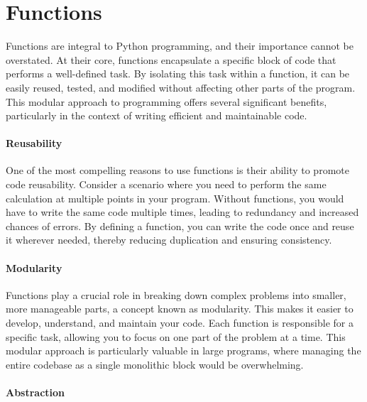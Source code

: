 \documentclass[
  letterpaper,
  DIV=11,
  numbers=noendperiod]{scrreprt}
\begin{document}
\hypertarget{sec-functions}{%
\chapter{Functions}\label{sec-functions}}

Functions are integral to Python programming, and their importance
cannot be overstated. At their core, functions encapsulate a specific
block of code that performs a well-defined task. By isolating this task
within a function, it can be easily reused, tested, and modified without
affecting other parts of the program. This modular approach to
programming offers several significant benefits, particularly in the
context of writing efficient and maintainable code.

\hypertarget{reusability}{%
\subsubsection{Reusability}\label{reusability}}

One of the most compelling reasons to use functions is their ability to
promote code reusability. Consider a scenario where you need to perform
the same calculation at multiple points in your program. Without
functions, you would have to write the same code multiple times, leading
to redundancy and increased chances of errors. By defining a function,
you can write the code once and reuse it wherever needed, thereby
reducing duplication and ensuring consistency.

\hypertarget{modularity}{%
\subsubsection{Modularity}\label{modularity}}

Functions play a crucial role in breaking down complex problems into
smaller, more manageable parts, a concept known as modularity. This
makes it easier to develop, understand, and maintain your code. Each
function is responsible for a specific task, allowing you to focus on
one part of the problem at a time. This modular approach is particularly
valuable in large programs, where managing the entire codebase as a
single monolithic block would be overwhelming.

\hypertarget{abstraction}{%
\subsubsection{Abstraction}\label{abstraction}}
\end{document}
